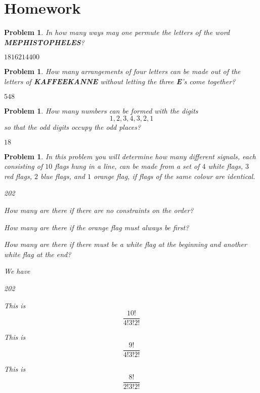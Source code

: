 \documentclass[11pt, openany]{book}
\theoremstyle{change} \theoremheaderfont{\blue\sffamily\bfseries}
\newtheorem{pro}[thm]{Problem}
\theoremstyle{nonumberplain} \theoremheaderfont{\sffamily\bfseries}
\newcommand{\í}{\'{\i}}
\begin{document}
\section*{Homework}
\begin{multicols}{2}\columnseprule 1pt \columnsep 25pt
\begin{pro}
In how many ways may one permute the letters of the word {\bf
MEPHISTOPHELES}? \begin{answer}$1816214400$
\end{answer}
   \end{pro}
   \begin{pro}
How many arrangements of four letters can be made out of the letters
of {\bf KAFFEEKANNE} without letting the three {\bf E}'s come
together?
\begin{answer}$548$
\end{answer}
  \end{pro}
   \begin{pro}
How many numbers can be formed with the digits $$1,2,3,4,3,2,1$$ so
that the odd digits occupy the odd places?
\begin{answer}$18$
\end{answer}
  \end{pro}

\begin{pro}
In this problem you will determine how many different signals, each
consisting
 of $10$ flags hung in a line, can be made from a set of $4$ white
 flags, $3$ red flags, $2$ blue flags, and $1$ orange flag, if
 flags of the same colour are identical.
\begin{dingautolist}{202}
\item How many are there if there are no constraints on the order?
 \item How many are there if the orange flag must always be
first? \item How many are there if there must be a white flag at the
beginning and another white flag at the end?
\end{dingautolist}
\begin{answer}We have
\begin{dingautolist}{202}
\item This is $$\dfrac{10!}{4!3!2!}   $$
 \item This is $$\dfrac{9!}{4!3!2!}   $$\item  This is
$$\dfrac{8!}{2!3!2!}   $$
\end{dingautolist}
\end{answer}
\end{pro}


\end{multicols}
\end{document}
